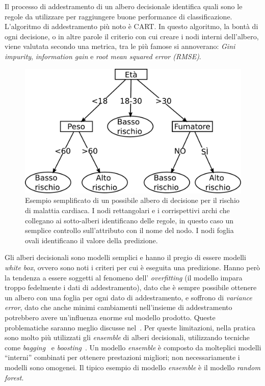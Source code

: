 Il processo di addestramento di un albero decisionale identifica quali sono le regole da utilizzare per raggiungere buone performance di classificazione. 
L'algoritmo di addestramento più noto è CART. 
In questo algoritmo, la bontà di ogni decisione, o in altre parole il criterio con cui creare i nodi interni dell'albero, viene valutata secondo una metrica, tra le più famose si annoverano: \emph{Gini impurity}, \emph{information gain} e \emph{root mean squared error (RMSE)}. 
\begin{figure}
    \centering
    \includegraphics[width=0.7\linewidth]{img/decision_tree.pdf}
    \caption[Esempio albero di decisione.]{Esempio semplificato di un possibile albero di decisione per il rischio di malattia cardiaca. I nodi rettangolari e i corrispettivi archi che collegano ai sotto-alberi identificano delle regole, in questo caso un semplice controllo sull'attributo con il nome del nodo. I nodi foglia ovali identificano il valore della predizione.}
    \label{fig:decision_tree}
\end{figure}
Gli alberi decisionali sono modelli semplici e hanno il pregio di essere modelli \emph{white box}, ovvero sono noti i criteri per cui è eseguita una predizione.
Hanno però la tendenza a essere soggetti al fenomeno dell' \emph{overfitting} (il modello impara troppo fedelmente i dati di addestramento), dato che è sempre possibile ottenere un albero con una foglia per ogni dato di addestramento, e soffrono di \emph{variance error}, dato che anche minimi cambiamenti nell'insieme di addestramento potrebbero avere un'influenza enorme sul modello prodotto.
Queste problematiche saranno meglio discusse nel~.
Per queste limitazioni, nella pratica sono molto più utilizzati gli \emph{ensemble} di alberi decisionali, utilizzando tecniche come \emph{bagging}~\cite{bagging_predictors} e \emph{boosting}~\cite{adaboost}.
Un modello \emph{ensemble} è composto da molteplici modelli ``interni'' combinati per ottenere prestazioni migliori; non necessariamente i modelli sono omogenei.
Il tipico esempio di modello \emph{ensemble} è il modello \emph{random forest}.

